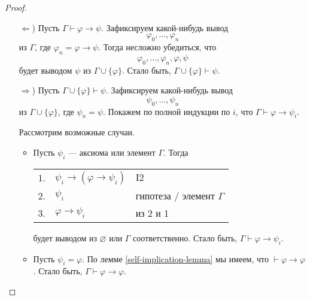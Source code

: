 \documentclass[12pt,a4paper]{article}
\begin{document}
    \begin{proof}
        \begin{itemize}
            \item[$\Longleftarrow$)] Пусть $\Gamma \vdash \varphi \rightarrow \psi$. Зафиксируем какой-нибудь вывод
                \[\varphi_0, \dots, \varphi_n\]
                из $\Gamma$, где $\varphi_n = \varphi \rightarrow \psi$. Тогда несложно убедиться, что
                \[\varphi_0, \dots, \varphi_n, \varphi, \psi\]
                будет выводом $\psi$ из $\Gamma \cup \{\varphi\}$. Стало быть, $\Gamma \cup \{\varphi\} \vdash \psi$.

            \item[$\Longrightarrow$)] Пусть $\Gamma \cup \{\varphi\} \vdash \psi$. Зафиксируем какой-нибудь вывод
                \[\psi_0, \dots, \psi_n\]
                из $\Gamma \cup \{\varphi\}$, где $\psi_n = \psi$. Покажем по полной индукции по $i$, что $\Gamma \vdash \varphi \rightarrow \psi_i$.

                Рассмотрим возможные случаи.
                \begin{itemize}
                    \item Пусть $\psi_i$ --- аксиома или элемент $\Gamma$. Тогда
                        \begin{center}
                            \begin{tabular}{rll}
                                1.& $\psi_i \rightarrow (\varphi \rightarrow \psi_i)$& $\mathrm{I2}$\\
                                2.& $\psi_i$& гипотеза / элемент $\Gamma$\\
                                3.& $\varphi \rightarrow \psi_i$& из 2 и 1\\
                            \end{tabular}
                        \end{center}
                        будет выводом из $\varnothing$ или $\Gamma$ соответственно. Стало быть, $\Gamma \vdash \varphi \rightarrow \psi_i$.

                    \item Пусть $\psi_i = \varphi$. По лемме \ref{self-implication-lemma} мы имеем, что $\vdash \varphi \rightarrow \varphi$. Стало быть, $\Gamma \vdash \varphi \rightarrow \varphi$.
                    

\end{itemize}
\end{itemize}
\end{proof}
\end{document}
